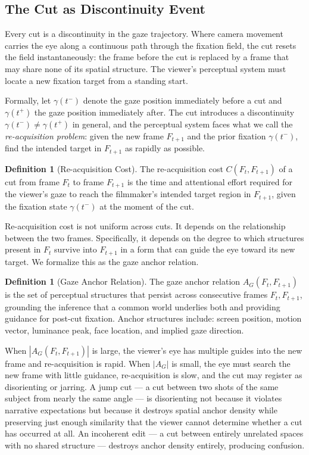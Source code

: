 \documentclass[12pt, a4paper]{article}
\theoremstyle{plain}
\theoremstyle{definition}
\newtheorem{definition}[theorem]{Definition}
\theoremstyle{remark}
\newcommand{\traj}{\gamma}
\newcommand{\AG}{A_G}
\begin{document}
\subsection{The Cut as Discontinuity Event}
\label{subsec:cut}

Every cut is a discontinuity in the gaze trajectory. Where
camera movement carries the eye along a continuous path
through the fixation field, the cut resets the field
instantaneously: the frame before the cut is replaced by a
frame that may share none of its spatial structure. The
viewer's perceptual system must locate a new fixation target
from a standing start.

Formally, let $\traj(t^-)$ denote the gaze position
immediately before a cut and $\traj(t^+)$ the gaze position
immediately after. The cut introduces a discontinuity
$\traj(t^-) \neq \traj(t^+)$ in general, and the
perceptual system faces what we call the \emph{re-acquisition
problem}: given the new frame $F_{t+1}$ and the prior
fixation $\traj(t^-)$, find the intended target in $F_{t+1}$
as rapidly as possible.

\begin{definition}[Re-acquisition Cost]
  The re-acquisition cost $C(F_t, F_{t+1})$ of a cut from
  frame $F_t$ to frame $F_{t+1}$ is the time and attentional
  effort required for the viewer's gaze to reach the
  filmmaker's intended target region in $F_{t+1}$, given
  the fixation state $\traj(t^-)$ at the moment of the cut.
\end{definition}

Re-acquisition cost is not uniform across cuts. It depends on
the relationship between the two frames. Specifically, it
depends on the degree to which structures present in $F_t$
survive into $F_{t+1}$ in a form that can guide the eye
toward its new target. We formalize this as the gaze anchor
relation.

\begin{definition}[Gaze Anchor Relation]
  The gaze anchor relation $\AG(F_t, F_{t+1})$ is the set
  of perceptual structures that persist across consecutive
  frames $F_t, F_{t+1}$, grounding the inference that a
  common world underlies both and providing guidance for
  post-cut fixation. Anchor structures include: screen
  position, motion vector, luminance peak, face location,
  and implied gaze direction.
\end{definition}

When $|\AG(F_t, F_{t+1})|$ is large, the viewer's eye has
multiple guides into the new frame and re-acquisition is
rapid. When $|\AG|$ is small, the eye must search the new
frame with little guidance, re-acquisition is slow, and the
cut may register as disorienting or jarring. A jump cut ---
a cut between two shots of the same subject from nearly the
same angle --- is disorienting not because it violates
narrative expectations but because it destroys spatial
anchor density while preserving just enough similarity that
the viewer cannot determine whether a cut has occurred at
all. An incoherent edit --- a cut between entirely unrelated
spaces with no shared structure --- destroys anchor density
entirely, producing confusion.
\end{document}
